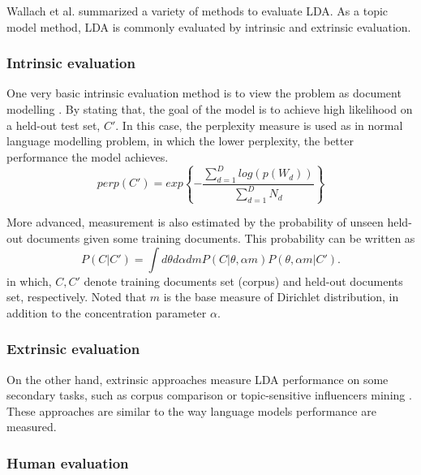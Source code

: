 \documentclass[conference,compsoc]{IEEEtran}
\begin{document}
Wallach et al. \cite{Wallach2009a} summarized a variety of methods to evaluate LDA. As a topic model method, LDA is commonly evaluated by intrinsic and extrinsic evaluation. 

\subsubsection{Intrinsic evaluation}
One very basic intrinsic evaluation method is to view the problem as document modelling \cite{Blei2003}. By stating that, the goal of the model is to achieve high likelihood on a held-out test set, $C'$. In this case, the perplexity measure is used as in normal language modelling problem, in which the lower perplexity, the better performance the model achieves.
\[perp(C')=exp\left\{-\frac{\sum_{d=1}^{D}{log(p(W_d))}}{\sum_{d=1}^{D}N_d}\right\}\]

More advanced, measurement is also estimated by the probability of unseen held-out documents given some training documents. This probability can be written as \cite{Wallach2009a}
\[P(C|C')=\int d\theta d\alpha dm P(C|\theta,\alpha m)P(\theta,\alpha m|C').\]
in which, $C, C'$ denote training documents set (corpus) and held-out documents set, respectively. Noted that $m$ is the base measure of Dirichlet distribution, in addition to the concentration parameter $\alpha$.


\subsubsection{Extrinsic evaluation}
On the other hand, extrinsic approaches measure LDA performance on some secondary tasks, such as corpus comparison \cite{zhao2011comparing} or topic-sensitive influencers mining \cite{Weng2010}. These approaches are similar to the way language models performance are measured.

\subsubsection{Human evaluation}
\end{document}
